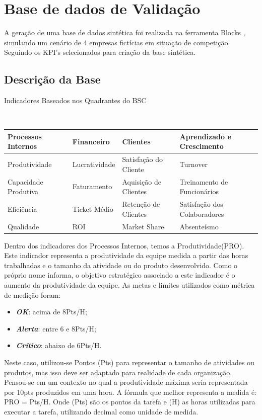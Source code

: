 \documentclass[
	12pt,				%
	openright,			%
	oneside,			%
	a4paper,			%
	english,			%
	brazil				%
	]{abntex2}
\begin{document}
\chapter{Base de dados de Validação}
\label{ch:base}

A geração de uma base de dados sintética foi realizada na ferramenta Blocks \cite{blocks}, simulando um cenário de 4 empresas fictícias em situação de competição. Seguindo os KPI's selecionados para criação da base sintética.


\section{Descrição da Base}

\begin{center}
\caption{Indicadores Baseados nos Quadrantes do BSC}\\
\label{tabela_indicadores}
\begin{tabular}{l|l|l|l}
\hline
Processos Internos & Financeiro & Clientes & Aprendizado e Crescimento\\
\hline
Produtividade & Lucratividade & Satisfação do Cliente & Turnover\\
Capacidade Produtiva & Faturamento & Aquisição de Clientes & Treinamento de Funcionários\\
Eficiência & Ticket Médio & Retenção de Clientes & Satisfação dos Colaboradores\\
Qualidade & ROI & Market Share & Absenteísmo\\
\hline

\end{tabular}
\end{center}

Dentro dos indicadores dos Processos Internos, temos a Produtividade(PRO). Este indicador representa a produtividade da equipe medida a partir das horas trabalhadas e o tamanho da atividade ou do produto desenvolvido. Como o próprio nome informa, o objetivo estratégico associado a este indicador é o aumento da produtividade da equipe. As metas e limites utilizados como métrica de medição foram:
\begin{itemize}
\item  \textbf{\textit{OK}}: acima de 8Pts/H;
\item  \textbf{\textit{Alerta}}: entre 6 e 8Pts/H;
\item  \textbf{\textit{Crítico}}: abaixo de 6Pts/H.
\end{itemize}

Neste caso, utilizou-se Pontos (Pts) para representar o tamanho de atividades ou produtos, mas isso deve ser adaptado para realidade de cada organização. Pensou-se em um contexto no qual a produtividade máxima seria representada por 10pts produzidos em uma hora. A fórmula que melhor representa a medida é: PRO = Pts/H. Onde (Pts) são os pontos da tarefa e (H) as horas utilizadas para executar a tarefa, utilizando decimal como unidade de medida.
\end{document}
